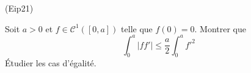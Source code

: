 \begin{tiny}(Eip21)\end{tiny} Soit $a>0$ et $f\in\mathcal{C}^1([0,a])$ telle que $f(0)=0$. Montrer que
\begin{displaymath}
 \int_0^a\left\vert ff'\right \vert \leq \frac{a}{2}\int_0^af'^2
\end{displaymath}
\'Etudier les cas d'égalité.